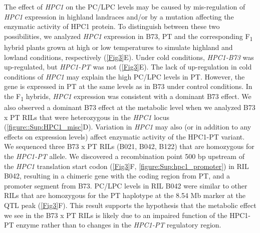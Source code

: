 \documentclass[9pt,twocolumn,twoside,lineno]{biorxiv}
\newcommand{\hpc}{\textit{HPC1}\xspace}
\begin{document}
The effect of \hpc on the PC/LPC levels may be caused by mis-regulation of \hpc expression in highland landraces and/or by a mutation affecting the enzymatic activity of HPC1 protein. 
To distinguish between these two possibilities, we analyzed \hpc expression in B73, PT and the corresponding F\textsubscript{1} hybrid plants grown at high or low temperatures to simulate highland and lowland conditions, respectively (\cref{Fig3}E). 
Under cold conditions, \textit{HPC1-B73} was up-regulated, but \textit{HPC1-PT} was not (\cref{Fig3}E). 
The lack of up-regulation in cold conditions of \hpc may explain the high PC/LPC levels in PT.
However, the gene is expressed in PT at the same levels as in B73 under control conditions.
In the F\textsubscript{1} hybrids, \hpc expression was consistent with a dominant B73 effect.
We also observed a dominant B73 effect at the metabolic level when we analyzed B73 x PT RILs that were heterozygous in the \hpc locus
(\cref{figure::Sup:HPC1_misc}D).
Variation in \hpc may also (or in addition to any effects on expression levels) affect enzymatic activity of the HPC1-PT variant. 
We sequenced three B73 x PT RILs (B021, B042, B122) that are homozygous for the \textit{HPC1-PT} allele.
We discovered a recombination point 500 bp upstream of the \hpc translation start codon (\cref{Fig3}F, \cref{figure:Sup:hpc1_promoter}) in RIL B042, resulting in a chimeric gene with the coding region from PT, and a promoter segment from B73.
PC/LPC levels in RIL B042 were similar to other RILs that are homozygous for the PT haplotype at the 8.54 Mb marker at the QTL peak (\cref{Fig3}F). 
This result supports the hypothesis that the metabolic effect we see in the B73 x PT RILs is likely due to an impaired function of the HPC1-PT enzyme rather than to changes in the \textit{HPC1-PT} regulatory region.
\end{document}
